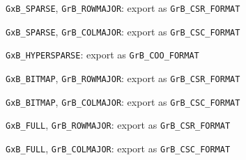 \begin{packed_itemize}
\item \verb'GxB_SPARSE', \verb'GrB_ROWMAJOR': export as \verb'GrB_CSR_FORMAT'
\item \verb'GxB_SPARSE', \verb'GrB_COLMAJOR': export as \verb'GrB_CSC_FORMAT'
\item \verb'GxB_HYPERSPARSE': export as \verb'GrB_COO_FORMAT'
\item \verb'GxB_BITMAP', \verb'GrB_ROWMAJOR': export as \verb'GrB_CSR_FORMAT'
\item \verb'GxB_BITMAP', \verb'GrB_COLMAJOR': export as \verb'GrB_CSC_FORMAT'
\item \verb'GxB_FULL', \verb'GrB_ROWMAJOR': export as \verb'GrB_CSR_FORMAT'
\item \verb'GxB_FULL', \verb'GrB_COLMAJOR': export as \verb'GrB_CSC_FORMAT'
\end{packed_itemize}


